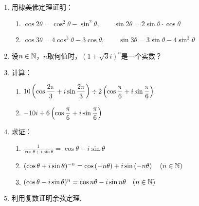 \begin{enumerate}
\item 用棣美佛定理证明：
\begin{enumerate}[(1)]
    \item $\cos2\theta=\cos^2\theta-\sin^2\theta,\qquad \sin2\theta=2\sin\theta\cdot \cos\theta$
    \item $\cos3\theta=4\cos^3\theta-3\cos\theta,\qquad \sin3\theta=3\sin\theta-4\sin^3\theta$
\end{enumerate}

\item 设$n\in\mathbb{N}$，$n$取何值时，$(1+\sqrt{3}i)^n$是一个实数？

\item 计算：
\begin{enumerate}[(1)]
    \item $10\left(\cos{\dfrac{2\pi}{3}}+i\sin{\dfrac{2\pi}{3}}\right)\div 2\left(\cos{\dfrac{\pi}{6}}+i\sin{\dfrac{\pi}{6}}\right)$
    \item $-10i\div 6\left(\cos{\dfrac{\pi}{6}}+i\sin{\dfrac{\pi}{6}}\right)$
\end{enumerate}

\item 求证：
\begin{enumerate}[(1)]
    \item $\frac{1}{\cos\theta+i\sin\theta}=\cos\theta-i\sin\theta$
    \item $(\cos{\theta}+i\sin{\theta})^{-n}=\cos\left(-n\theta\right)+i\sin\left(-n\theta\right)\quad (n\in\mathbb{N})$
    \item $(\cos\theta-i\sin\theta)^n=\cos n\theta-i\sin n \theta\quad (n\in\mathbb{N})$
\end{enumerate}

\item 利用复数证明余弦定理.


\end{enumerate}
